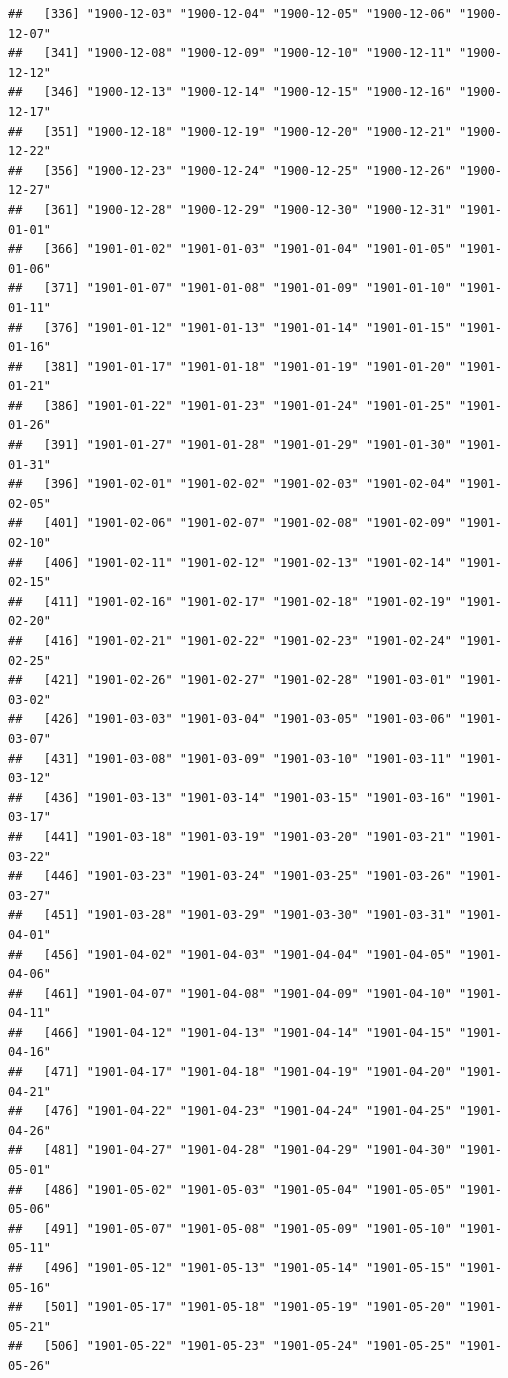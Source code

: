\documentclass{article}\usepackage[]{graphicx}\usepackage[]{color}
\makeatletter
\newenvironment{kframe}{%
 \def\at@end@of@kframe{}%
 \ifinner\ifhmode%
  \def\at@end@of@kframe{\end{minipage}}%
  \begin{minipage}{\columnwidth}%
 \fi\fi%
 \def\FrameCommand##1{\hskip\@totalleftmargin \hskip-\fboxsep
 \colorbox{shadecolor}{##1}\hskip-\fboxsep
     \hskip-\linewidth \hskip-\@totalleftmargin \hskip\columnwidth}%
 \MakeFramed {\advance\hsize-\width
   \@totalleftmargin\z@ \linewidth\hsize
   \@setminipage}}%
 {\par\unskip\endMakeFramed%
 \at@end@of@kframe}
\newenvironment{knitrout}{}{} %
\makeatother
\begin{document}
\begin{description}
\begin{knitrout}
\begin{kframe}
\begin{verbatim}
##   [336] "1900-12-03" "1900-12-04" "1900-12-05" "1900-12-06" "1900-12-07"
##   [341] "1900-12-08" "1900-12-09" "1900-12-10" "1900-12-11" "1900-12-12"
##   [346] "1900-12-13" "1900-12-14" "1900-12-15" "1900-12-16" "1900-12-17"
##   [351] "1900-12-18" "1900-12-19" "1900-12-20" "1900-12-21" "1900-12-22"
##   [356] "1900-12-23" "1900-12-24" "1900-12-25" "1900-12-26" "1900-12-27"
##   [361] "1900-12-28" "1900-12-29" "1900-12-30" "1900-12-31" "1901-01-01"
##   [366] "1901-01-02" "1901-01-03" "1901-01-04" "1901-01-05" "1901-01-06"
##   [371] "1901-01-07" "1901-01-08" "1901-01-09" "1901-01-10" "1901-01-11"
##   [376] "1901-01-12" "1901-01-13" "1901-01-14" "1901-01-15" "1901-01-16"
##   [381] "1901-01-17" "1901-01-18" "1901-01-19" "1901-01-20" "1901-01-21"
##   [386] "1901-01-22" "1901-01-23" "1901-01-24" "1901-01-25" "1901-01-26"
##   [391] "1901-01-27" "1901-01-28" "1901-01-29" "1901-01-30" "1901-01-31"
##   [396] "1901-02-01" "1901-02-02" "1901-02-03" "1901-02-04" "1901-02-05"
##   [401] "1901-02-06" "1901-02-07" "1901-02-08" "1901-02-09" "1901-02-10"
##   [406] "1901-02-11" "1901-02-12" "1901-02-13" "1901-02-14" "1901-02-15"
##   [411] "1901-02-16" "1901-02-17" "1901-02-18" "1901-02-19" "1901-02-20"
##   [416] "1901-02-21" "1901-02-22" "1901-02-23" "1901-02-24" "1901-02-25"
##   [421] "1901-02-26" "1901-02-27" "1901-02-28" "1901-03-01" "1901-03-02"
##   [426] "1901-03-03" "1901-03-04" "1901-03-05" "1901-03-06" "1901-03-07"
##   [431] "1901-03-08" "1901-03-09" "1901-03-10" "1901-03-11" "1901-03-12"
##   [436] "1901-03-13" "1901-03-14" "1901-03-15" "1901-03-16" "1901-03-17"
##   [441] "1901-03-18" "1901-03-19" "1901-03-20" "1901-03-21" "1901-03-22"
##   [446] "1901-03-23" "1901-03-24" "1901-03-25" "1901-03-26" "1901-03-27"
##   [451] "1901-03-28" "1901-03-29" "1901-03-30" "1901-03-31" "1901-04-01"
##   [456] "1901-04-02" "1901-04-03" "1901-04-04" "1901-04-05" "1901-04-06"
##   [461] "1901-04-07" "1901-04-08" "1901-04-09" "1901-04-10" "1901-04-11"
##   [466] "1901-04-12" "1901-04-13" "1901-04-14" "1901-04-15" "1901-04-16"
##   [471] "1901-04-17" "1901-04-18" "1901-04-19" "1901-04-20" "1901-04-21"
##   [476] "1901-04-22" "1901-04-23" "1901-04-24" "1901-04-25" "1901-04-26"
##   [481] "1901-04-27" "1901-04-28" "1901-04-29" "1901-04-30" "1901-05-01"
##   [486] "1901-05-02" "1901-05-03" "1901-05-04" "1901-05-05" "1901-05-06"
##   [491] "1901-05-07" "1901-05-08" "1901-05-09" "1901-05-10" "1901-05-11"
##   [496] "1901-05-12" "1901-05-13" "1901-05-14" "1901-05-15" "1901-05-16"
##   [501] "1901-05-17" "1901-05-18" "1901-05-19" "1901-05-20" "1901-05-21"
##   [506] "1901-05-22" "1901-05-23" "1901-05-24" "1901-05-25" "1901-05-26"

\end{verbatim}
\end{kframe}
\end{knitrout}
\end{description}
\end{document}
